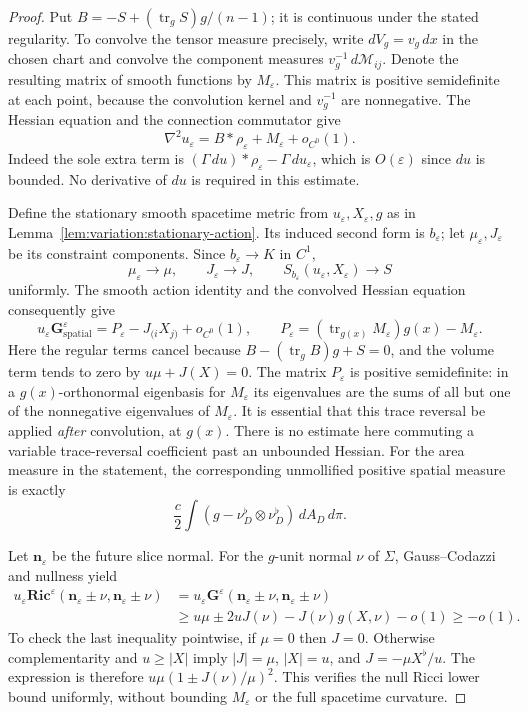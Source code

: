 \begin{proof}
Put $B=-S+(\operatorname{tr}_gS)g/(n-1)$; it is continuous under the
stated regularity.  To convolve the tensor measure precisely, write
$dV_g=v_g\,dx$ in the chosen chart and convolve the component measures
$v_g^{-1}\,d\mathcal M_{ij}$.  Denote the resulting matrix of smooth
functions by $M_\varepsilon$.  This matrix is positive semidefinite at
each point, because the convolution kernel and $v_g^{-1}$ are
nonnegative.  The Hessian equation and the connection commutator give
\[
 \nabla^2u_\varepsilon=B*\rho_\varepsilon
                            +M_\varepsilon+o_{C^0}(1).
\]
Indeed the sole extra term is
$(\Gamma\,du)*\rho_\varepsilon-\Gamma\,d u_\varepsilon$, which is
$O(\varepsilon)$ since $du$ is bounded.  No derivative of $du$ is
required in this estimate.

Define the stationary smooth spacetime metric from
$u_\varepsilon,X_\varepsilon,g$ as in
Lemma~\ref{lem:variation:stationary-action}.  Its induced second form is
$b_\varepsilon$; let $\mu_\varepsilon,J_\varepsilon$ be its constraint
components.  Since $b_\varepsilon\to K$ in $C^1$,
\[
 \mu_\varepsilon\to\mu,\qquad J_\varepsilon\to J,\qquad
 S_{b_\varepsilon}(u_\varepsilon,X_\varepsilon)\to S
\]
uniformly.  The smooth action identity and the convolved Hessian
equation consequently give
\[
 u_\varepsilon\mathbf G^\varepsilon_{\mathrm{spatial}}
   =P_\varepsilon-J_{(i}X_{j)}+o_{C^0}(1),\qquad
 P_\varepsilon=(\operatorname{tr}_{g(x)}M_\varepsilon)g(x)
                                                     -M_\varepsilon.
\]
Here the regular terms cancel because
$B-(\operatorname{tr}_gB)g+S=0$, and the volume term tends to zero by
$u\mu+J(X)=0$.  The matrix $P_\varepsilon$ is positive semidefinite:
in a $g(x)$-orthonormal eigenbasis for $M_\varepsilon$ its eigenvalues
are the sums of all but one of the nonnegative eigenvalues of
$M_\varepsilon$.  It is essential that this trace reversal be applied
\emph{after} convolution, at $g(x)$.  There is no estimate here
commuting a variable trace-reversal coefficient past an unbounded
Hessian.  For the area measure in the statement, the corresponding
unmollified positive spatial measure is exactly
\[
 \frac c2\int(g-\nu_D^\flat\otimes\nu_D^\flat)\,dA_D\,d\pi.
\]

Let $\mathbf n_\varepsilon$ be the future slice normal.  For the
$g$-unit normal $\nu$ of $\Sigma$, Gauss--Codazzi and nullness yield
\[
 \begin{split}
 u_\varepsilon\mathbf{Ric}^\varepsilon
       (\mathbf n_\varepsilon\pm\nu,
        \mathbf n_\varepsilon\pm\nu)
 &=u_\varepsilon\mathbf G^\varepsilon
       (\mathbf n_\varepsilon\pm\nu,
        \mathbf n_\varepsilon\pm\nu)\\
 &\geq u\mu\pm2uJ(\nu)-J(\nu)g(X,\nu)-o(1)\geq-o(1).
 \end{split}
\]
To check the last inequality pointwise, if $\mu=0$ then $J=0$.
Otherwise complementarity and $u\geq|X|$ imply
$|J|=\mu$, $|X|=u$, and $J=-\mu X^\flat/u$.  The expression is
therefore $u\mu(1\pm J(\nu)/\mu)^2$.  This verifies the null Ricci
lower bound uniformly, without bounding $M_\varepsilon$ or the full
spacetime curvature.


\end{proof}
